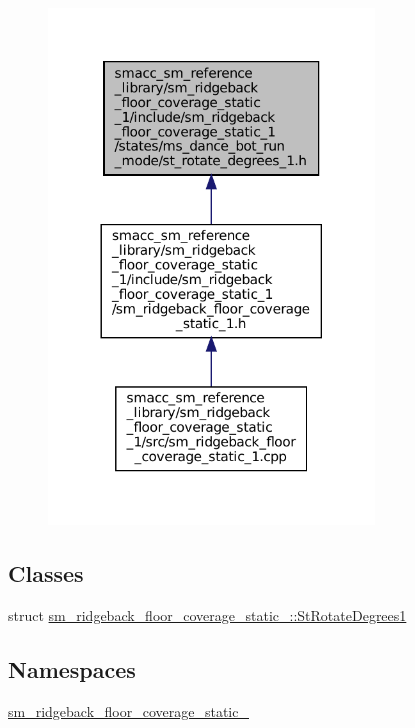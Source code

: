 \begin{figure}[H]
\begin{center}
\leavevmode
\includegraphics[width=245pt]{sm__ridgeback__floor__coverage__static__1_2include_2sm__ridgeback__floor__coverage__static__1_2s21fe8469db848a8ade9e777cc15169c2}
\end{center}
\end{figure}
\subsection*{Classes}
\begin{DoxyCompactItemize}
\item 
struct \hyperlink{structsm__ridgeback__floor__coverage__static__1_1_1StRotateDegrees1}{sm\+\_\+ridgeback\+\_\+floor\+\_\+coverage\+\_\+static\+\_\+::\+St\+Rotate\+Degrees1}
\end{DoxyCompactItemize}
\subsection*{Namespaces}
\begin{DoxyCompactItemize}
\item 
 \hyperlink{namespacesm__ridgeback__floor__coverage__static__1}{sm\+\_\+ridgeback\+\_\+floor\+\_\+coverage\+\_\+static\+\_}
\end{DoxyCompactItemize}
